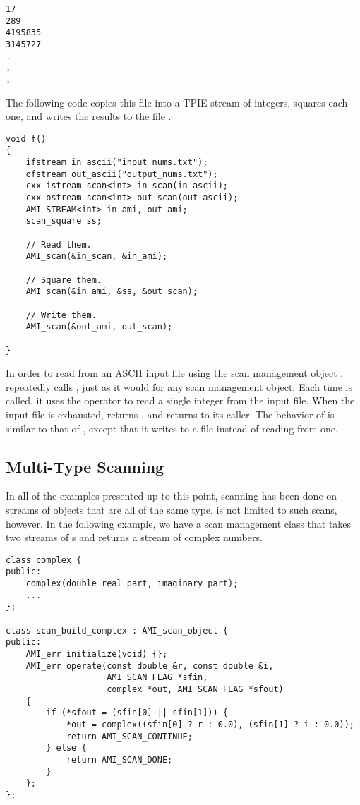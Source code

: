 \begin{verbatim}
17
289
4195835
3145727
.
.
.
\end{verbatim}

The following code copies this file into a TPIE stream of
integers, squares each one, and
writes the results to the file .

\begin{verbatim}
void f()
{
    ifstream in_ascii("input_nums.txt");
    ofstream out_ascii("output_nums.txt");
    cxx_istream_scan<int> in_scan(in_ascii);
    cxx_ostream_scan<int> out_scan(out_ascii);
    AMI_STREAM<int> in_ami, out_ami;
    scan_square ss;    

    // Read them.
    AMI_scan(&in_scan, &in_ami);

    // Square them.
    AMI_scan(&in_ami, &ss, &out_scan);
    
    // Write them.
    AMI_scan(&out_ami, out_scan);

}    
\end{verbatim}

In order to read from an ASCII input file using the scan
management object , 
repeatedly calls , just as it
would for any scan management object.  Each time
 is called, it uses the
\myverb{>>} operator to read a single integer from the input
file.  When the input file is exhausted,
 returns
, and  returns
to its caller.  The behavior of  is
similar to that of , except that it writes
to a file instead of reading from one.

\subsection{Multi-Type Scanning}


In all of the examples presented up to this point, scanning
has been done on streams of objects that are all of the same
type.   is not limited to such scans,
however.  In the following example, we have a scan
management class that takes two streams of s
and returns a stream of complex numbers.

\begin{verbatim}
class complex {
public:
    complex(double real_part, imaginary_part);
    ...
};

class scan_build_complex : AMI_scan_object {
public:
    AMI_err initialize(void) {};
    AMI_err operate(const double &r, const double &i, 
                    AMI_SCAN_FLAG *sfin,
                    complex *out, AMI_SCAN_FLAG *sfout)
    {
        if (*sfout = (sfin[0] || sfin[1])) {
            *out = complex((sfin[0] ? r : 0.0), (sfin[1] ? i : 0.0));
            return AMI_SCAN_CONTINUE;
        } else {
            return AMI_SCAN_DONE;
        }   
    };
};
\end{verbatim}

